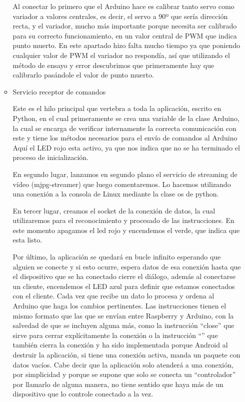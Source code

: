\documentclass{pclass}
\begin{document}
\begin{itemize}
\begin{itemize}
	Al conectar lo primero que el Arduino hace es calibrar tanto servo como variador a valores centrales, es decir, el servo a 90º que sería dirección recta, y el variador, mucho más importante porque necesita ser calibrado para su correcto funcionamiento, en un valor central de PWM que indica punto muerto. En este apartado hizo falta mucho tiempo ya que poniendo cualquier valor de PWM el variador no respondía, así que utilizando el método de ensayo y error descubrimos que primeramente hay que calibrarlo pasándole el valor de punto muerto.
	
	\medskip
	
	\item Servicio receptor de comandos
	
	Este es el hilo principal que vertebra a toda la aplicación, escrito en Python, en el cual primeramente se crea una variable de la clase Arduino, la cual se encarga de verificar internamente la correcta comunicación con este y tiene los métodos necesarios para el envío de comandos al Arduino Aquí el LED rojo esta activo, ya que nos indica que no se ha terminado el proceso de inicialización.
	
	En segundo lugar, lanzamos en segundo plano el servicio de streaming de vídeo (mjpg-streamer) que luego comentaremos. Lo hacemos utilizando una conexión a la consola de Linux mediante la clase os de python. 
	
	En tercer lugar, creamos el socket de la conexión de datos, la cual utilizaremos para el reconocimiento y procesado de las instrucciones. En este momento apagamos el led rojo y encendemos el verde, que indica que esta listo.
	
	Por último, la aplicación se quedará en bucle infinito esperando que alguien se conecte y si esto ocurre, espera datos de esa conexión hasta que el dispositivo que se ha conectado cierre el diálogo, además al conectarse un cliente, encendemos el LED azul para definir que estamos conectados con el cliente. Cada vez que recibe un dato lo procesa y ordena al Arduino que haga los cambios pertinentes. Las instrucciones tienen el mismo formato que las que se envían entre Raspberry y Arduino, con la salvedad de que se incluyen alguna más, como la instrucción ``close'' que sirve para cerrar explícitamente la conexión o la instrucción ``'' que también cierra la conexión y ha sido implementada porque Android al destruir la aplicación, si tiene una conexión activa, manda un paquete con datos vacíos. Cabe decir que la aplicación solo atenderá a una conexión, por simplicidad y porque se supone que solo se conecta un ``controlador'' por llamarlo de alguna manera, no tiene sentido que haya más de un dispositivo que lo controle conectado a la vez. 
	

\end{itemize}
\end{itemize}
\end{document}
